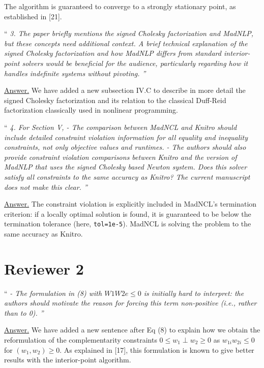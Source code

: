 \documentclass[10pt,a4paper]{article}
\newenvironment{quotereviewer}{\vspace{.5cm}{\underline\reviewername} ``\it\footnotesize}{''}
\newcommand{\answer}{\vspace{1mm}\underline{Answer.} }
\begin{document}
The algorithm is guaranteed to converge to a strongly stationary point,
as established in [21].

\begin{quotereviewer}
3. The paper briefly mentions the signed Cholesky factorization and MadNLP, but these concepts need additional context. A brief technical explanation of the signed Cholesky factorization and how MadNLP differs from standard interior-point solvers would be beneficial for the audience, particularly regarding how it handles indefinite systems without pivoting.
\end{quotereviewer}

\answer
We have added a new subsection IV.C to describe in more detail the signed
Cholesky factorization and its relation to the classical Duff-Reid factorization
classically used in nonlinear programming.

\begin{quotereviewer}
4. For Section V,
- The comparison between MadNCL and Knitro should include detailed constraint violation information for all equality and inequality constraints, not only objective values and runtimes.
- The authors should also provide constraint violation comparisons between Knitro and the version of MadNLP that uses the signed Cholesky based Newton system. Does this solver satisfy all constraints to the same accuracy as Knitro? The current manuscript does not make this clear.
\end{quotereviewer}

\answer
The constraint violation is explicitly included in MadNCL's termination criterion:
if a locally optimal solution is found, it is guaranteed to be below the termination tolerance (here, {\tt tol=1e-5}). MadNCL is solving the problem to the same accuracy as Knitro.

\section{Reviewer 2}
\def\reviewername{Reviewer~\#2}
\bigskip


\begin{quotereviewer}
- The formulation in (8) with $W1W2e \le 0$ is initially hard to interpret: the authors should motivate the reason for forcing this term non-positive (i.e., rather than to 0).
\end{quotereviewer}

\answer
We have added a new sentence after Eq (8) to explain how we obtain the reformulation
of the complementarity constraints $0 \leq w_1 \perp w_2 \geq 0$ as $w_{1i} w_{2i} \leq 0$
for $(w_1, w_2) \geq 0$. As explained in [17], this formulation is known to give
better results with the interior-point algorithm.
\end{document}
